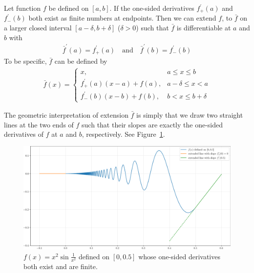 \documentclass[thmcnt=section, 12pt]{my-elegantbook}
\begin{document}
\begin{lemma} \label{lem:6}
    Let function $f$ be defined on $[a, b]$.
    If the one-sided derivatives $f^\prime_{+}(a)$
    and $f^\prime_{-}(b)$ both exist as finite numbers
    at endpoints.
    Then we can extend $f$, to $\bar{f}$ on a larger
    closed interval $[a-\delta, b+\delta]$ ($\delta > 0$)
    such that $\bar{f}$ is differentiable at $a$ and $b$
    with
    \begin{align*}
        \bar{f}^\prime(a) = f^\prime_{+}(a)
        \quad \text{and} \quad
        \bar{f}^\prime(b) = f^\prime_{-}(b)
    \end{align*}
    To be specific, $\bar{f}$ can be defined by
    \begin{align*}
        \bar{f}(x) =
        \begin{cases}
            x,
             & a \leq x \leq b       \\
            f^\prime_{+}(a) (x - a) + f(a),
             & a - \delta \leq x < a \\
            f^\prime_{-}(b) (x - b) + f(b),
             & b < x \leq b + \delta
        \end{cases}
    \end{align*}
\end{lemma}

The geometric interpretation of extension $\bar{f}$ is
simply that we draw two straight lines at the two ends
of $f$ such that their slopes are exactly
the one-sided derivatives of $f$ at $a$ and $b$, respectively.
See Figure~\ref{fig:16}.

\begin{figure}[ht]
    \centering
    \includegraphics[scale=0.5]{figures/ma-016.png}
    \caption{$f(x) = x^2 \sin \frac{1}{x^2}$ defined on $[0, 0.5]$ whose one-sided derivatives both exist and are finite.}
    \label{fig:16}
\end{figure}
\end{document}
